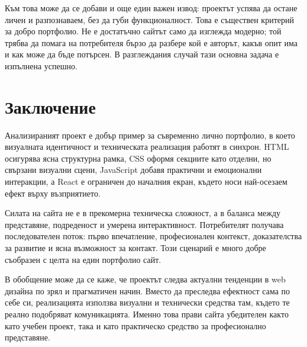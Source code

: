 \documentclass[11pt,a4paper]{article}
\begin{document}
Към това може да се добави и още един важен извод: проектът успява да остане личен и разпознаваем, без да губи функционалност. Това е съществен критерий за добро портфолио. Не е достатъчно сайтът само да изглежда модерно; той трябва да помага на потребителя бързо да разбере кой е авторът, какъв опит има и как може да бъде потърсен. В разглеждания случай тази основна задача е изпълнена успешно.

\section{Заключение}
Анализираният проект е добър пример за съвременно лично портфолио, в което визуалната идентичност и техническата реализация работят в синхрон. HTML осигурява ясна структурна рамка, CSS оформя секциите като отделни, но свързани визуални сцени, JavaScript добавя практични и емоционални интеракции, а React е ограничен до началния екран, където носи най-осезаем ефект върху възприятието.

Силата на сайта не е в прекомерна техническа сложност, а в баланса между представяне, подреденост и умерена интерактивност. Потребителят получава последователен поток: първо впечатление, професионален контекст, доказателства за развитие и ясна възможност за контакт. Този сценарий е много добре съобразен с целта на един портфолио сайт.

В обобщение може да се каже, че проектът следва актуални тенденции в web дизайна по зрял и прагматичен начин. Вместо да преследва ефектност сама по себе си, реализацията използва визуални и технически средства там, където те реално подобряват комуникацията. Именно това прави сайта убедителен както като учебен проект, така и като практическо средство за професионално представяне.
\end{document}
